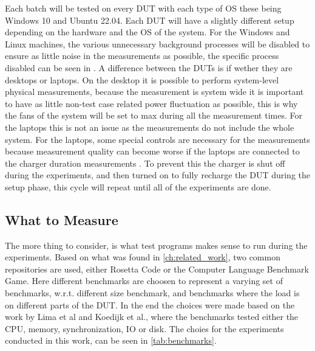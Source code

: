 Each batch will be tested on every DUT with each type of OS these being Windows 10 and Ubuntu 22.04. Each DUT will have a slightly different setup depending on the hardware and the OS of the system. For the Windows and Linux machines, the various unnecessary background processes will be disabled to ensure as little noise in the measurements as possible\cite*[]{sestoft2013microbenchmarks}, the specific process disabled can be seen in . A difference between the DUTs is if wether they are desktops or laptops. On the desktop it is possible to perform system-level physical measurements, because the measurement is system wide it is important to have as little non-test case related power fluctuation as possible, this is why the fans of the system will be set to max during all the measurement times. For the laptops this is not an issue as the measurements do not include the whole system. For the laptops, some special controls are necessary for the measurements because measurement quality can become worse if the laptops are connected to the charger duration measurements \cite{E3Video}. To prevent this the charger is shut off during the experiments, and then turned on to fully recharge the DUT during the setup phase, this cycle will repeat until all of the experiments are done.

\subsection{What to Measure}

The more thing to consider, is what test programs makes sense to run during the experiments. Based on what was found in \cref*{ch:related_work}, two common repositories are used, either Rosetta Code\cite*[]{rosetta_code} or the Computer Language Benchmark Game\cite*[]{benchmark_game}. Here different benchmarks are choosen to represent a varying set of benchmarks, w.r.t. different size benchmark, and benchmarks where the load is on different parts of the DUT. In the end the choices were made based on the work by Lima et al\cite*[]{greenland2016statistical} and Koedijk et al.\cite*[]{Koedijk2022diff}, where the benchmarks tested either the CPU, memory, synchronization, IO or disk. The choies for the experiments conducted in this work, can be seen in \cref*{tab:benchmarks}.




